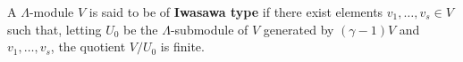 A $\Lambda$-module $V$ is said to be of \textbf{Iwasawa type} if there exist elements $v_1, \dots, v_s \in V$ such that, letting $U_0$ be the $\Lambda$-submodule of $V$ generated by $(\gamma-1)V$ and $v_1, \dots, v_s$, the quotient $V/U_0$ is finite.
